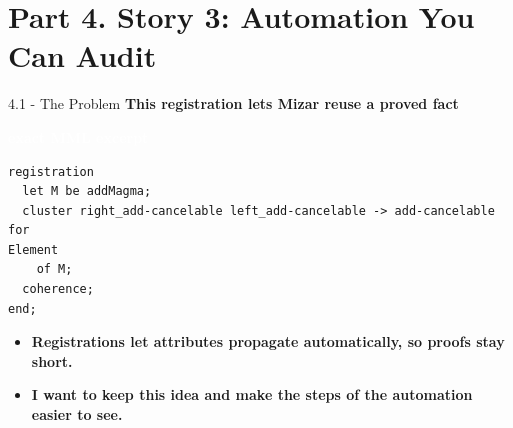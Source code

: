 \documentclass[aspectratio=169,11pt]{beamer}
\newcommand{\statusbadge}[2]{\colorbox{#1}{\textcolor{white}{\strut\scriptsize\sffamily\bfseries #2}}}
\newcommand{\badgeMML}{\statusbadge{blue!45!black}{exact MML excerpt}}
\begin{document}
\section{Part 4. Story 3: Automation You Can Audit}
\begin{frame}[fragile,t]{4.1 - The Problem}
\smallskip
\textbf{This registration lets Mizar reuse a proved fact}~\badgeMML
\begin{lstlisting}[language={mizar},basicstyle=\ttfamily\small]
registration
  let M be addMagma;
  cluster right_add-cancelable left_add-cancelable -> add-cancelable for
Element
    of M;
  coherence;
end;
\end{lstlisting}
\begin{itemize}
\setlength{\itemsep}{1pt}
\setlength{\parsep}{0pt}
\setlength{\parskip}{0pt}
\item \textcolor{blue!55!black}{\textbf{Registrations let attributes propagate automatically, so proofs stay short.}}
\item \textcolor{blue!55!black}{\textbf{I want to keep this idea and make the steps of the automation easier to see.}}
\end{itemize}
\end{frame}
\end{document}
